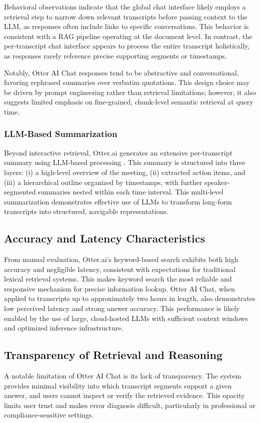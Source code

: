 Behavioral observations indicate that the global chat interface likely employs a retrieval step to narrow down relevant transcripts before passing context to the LLM, as responses often include links to specific conversations. This behavior is consistent with a RAG pipeline operating at the document level. In contrast, the per-transcript chat interface appears to process the entire transcript holistically, as responses rarely reference precise supporting segments or timestamps.

Notably, Otter AI Chat responses tend to be abstractive and conversational, favoring rephrased summaries over verbatim quotations. This design choice may be driven by prompt engineering rather than retrieval limitations; however, it also suggests limited emphasis on fine-grained, chunk-level semantic retrieval at query time. 

\subsubsection{LLM-Based Summarization}

Beyond interactive retrieval, Otter.ai generates an extensive per-transcript summary using LLM-based processing \cite{otter_appstore}. This summary is structured into three layers: (i) a high-level overview of the meeting, (ii) extracted action items, and (iii) a hierarchical outline organized by timestamps, with further speaker-segmented summaries nested within each time interval. This multi-level summarization demonstrates effective use of LLMs to transform long-form transcripts into structured, navigable representations. 

\subsection{Accuracy and Latency Characteristics}
From manual evaluation, Otter.ai’s keyword-based search exhibits both high accuracy and negligible latency, consistent with expectations for traditional lexical retrieval systems. This makes keyword search the most reliable and responsive mechanism for precise information lookup. Otter AI Chat, when applied to transcripts up to approximately two hours in length, also demonstrates low perceived latency and strong answer accuracy. This performance is likely enabled by the use of large, cloud-hosted LLMs with sufficient context windows and optimized inference infrastructure.

\subsection{Transparency of Retrieval and Reasoning}
A notable limitation of Otter AI Chat is its lack of transparency. The system provides minimal visibility into which transcript segments support a given answer, and users cannot inspect or verify the retrieved evidence. This opacity limits user trust and makes error diagnosis difficult, particularly in professional or compliance-sensitive settings.

